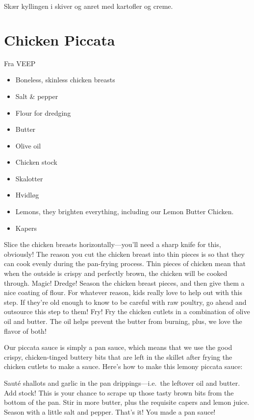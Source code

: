 \documentclass[
]{book}
\providecommand{\tightlist}{%
  \setlength{\itemsep}{0pt}\setlength{\parskip}{0pt}}
\begin{document}
Skær kyllingen i skiver og anret med kartofler og creme.

\hypertarget{chicken-piccata}{%
\section{Chicken Piccata}\label{chicken-piccata}}

Fra VEEP

\begin{itemize}
\tightlist
\item
  Boneless, skinless chicken breasts
\item
  Salt \& pepper
\item
  Flour for dredging
\item
  Butter
\item
  Olive oil
\item
  Chicken stock
\item
  Skalotter
\item
  Hvidløg
\item
  Lemons, they brighten everything, including our Lemon Butter Chicken.
\item
  Kapers
\end{itemize}

Slice the chicken breasts horizontally---you'll need a sharp knife for this, obviously! The reason you cut the chicken breast into thin pieces is so that they can cook evenly during the pan-frying process. Thin pieces of chicken mean that when the outside is crispy and perfectly brown, the chicken will be cooked through. Magic!
Dredge! Season the chicken breast pieces, and then give them a nice coating of flour. For whatever reason, kids really love to help out with this step. If they're old enough to know to be careful with raw poultry, go ahead and outsource this step to them!
Fry! Fry the chicken cutlets in a combination of olive oil and butter. The oil helps prevent the butter from burning, plus, we love the flavor of both!

Our piccata sauce is simply a pan sauce, which means that we use the good crispy, chicken-tinged buttery bits that are left in the skillet after frying the chicken cutlets to make a sauce. Here's how to make this lemony piccata sauce:

Sauté shallots and garlic in the pan drippings---i.e.~the leftover oil and butter.
Add stock! This is your chance to scrape up those tasty brown bits from the bottom of the pan.
Stir in more butter, plus the requisite capers and lemon juice.
Season with a little salt and pepper.
That's it! You made a pan sauce!
\end{document}
